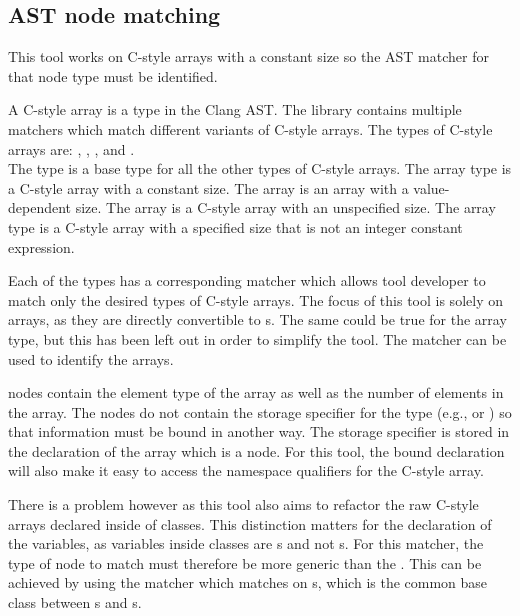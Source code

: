 \subsection{AST node matching}\label{subsec:085tool_example:030cstyle:node_matching}

This tool works on C-style arrays with a constant size so the AST matcher for that node type must be identified.

A C-style array is a type in the Clang AST. The library contains multiple matchers which match different variants of C-style arrays. The types of C-style arrays are: , , ,  and . \\
The  type is a base type for all the other types of C-style arrays. The  array type is a C-style array with a constant size. The  array is an array with a value-dependent size. The  array is a C-style array with an unspecified size. The  array type is a C-style array with a specified size that is not an integer constant expression.

Each of the types has a corresponding matcher which allows tool developer to match only the desired types of C-style arrays. The focus of this tool is solely on  arrays, as they are directly convertible to s.
The same could be true for the  array type, but this has been left out in order to simplify the tool.
The  matcher can be used to identify the  arrays.

 nodes contain the element type of the array as well as the number of elements in the array. The nodes do not contain the storage specifier for the type (e.g.,  or ) so that information must be bound in another way. The storage specifier is stored in the declaration of the array which is a  node. For this tool, the bound declaration will also make it easy to access the namespace qualifiers for the C-style array. 

There is a problem however as this tool also aims to refactor the raw C-style arrays declared inside of classes. This distinction matters for the declaration of the variables, as variables inside classes are s and not s. For this matcher, the type of node to match must therefore be more generic than the . This can be achieved by using the  matcher which matches on s, which is the common base class between s and s.

